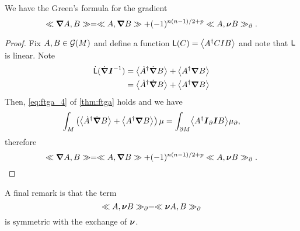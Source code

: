 \begin{theorem}
\label{thm:multivector_greens_formula}
We have the Green's formula for the gradient
\begin{equation}
\ll \boldsymbol{\nabla} A, B\gg = \ll A, \boldsymbol{\nabla} B\gg + (-1)^{n(n-1)/2+p} \ll A, \boldsymbol{\nu} B\gg_\partial.
\end{equation}
\end{theorem}
\begin{proof}
Fix $A,B \in \mathcal{G}(M)$ and define a function $\mathsf{L}(C) = \left\langle A^\dagger C I B\right\rangle_{}$ and note that $\sf{L}$ is linear.  Note
\begin{align}
\dot{\sf{L}}(\dot{\boldsymbol{\nabla}}\boldsymbol{I}^{-1}) &= \left\langle\dot{A}^\dagger \dot{\boldsymbol{\nabla}} B\right\rangle_{} + \left\langle A^\dagger \boldsymbol{\nabla} B\right\rangle_{}\\
&=\left\langle\dot{A}^\dagger \dot{\boldsymbol{\nabla}} B\right\rangle_{} +  \left\langle A^\dagger \boldsymbol{\nabla} B\right\rangle_{}
\end{align} 
Then, \cref{eq:ftga_4} of \cref{thm:ftga} holds and we have
\begin{equation}
\int_M \left(\proj{}{\dot{A}^\dagger \dot{\grad}  B} + \proj{}{A^\dagger \grad B} \right) \mu = \int_\boundary \proj{}{A^\dagger \pseudoscalar_\partial \pseudoscalar B}\mu_\partial,
\end{equation}
therefore
\begin{equation}
\ll \boldsymbol{\nabla} A, B\gg = \ll A, \boldsymbol{\nabla} B\gg + (-1)^{n(n-1)/2+p} \ll A, \boldsymbol{\nu} B\gg_\partial.
\end{equation}
\end{proof}
A final remark is that the term
\begin{equation}
\ll A, \boldsymbol{\nu} B\gg_\partial = \ll \boldsymbol{\nu} A, B\gg_\partial
\end{equation}
is symmetric with the exchange of $\boldsymbol{\nu}$. 

